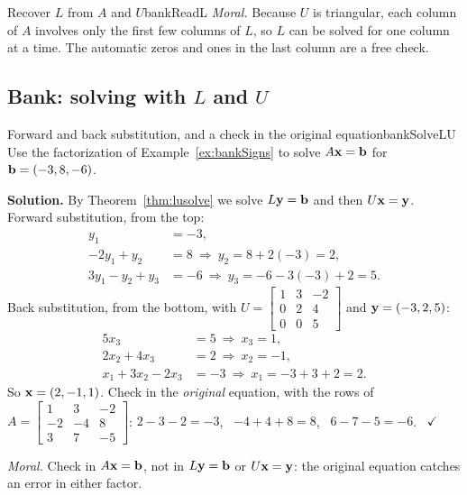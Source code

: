 \documentclass[11pt]{article}
\begin{document}
\begin{exmp}{Recover $L$ from $A$ and $U$}{bankReadL}
\emph{Moral.} Because $U$ is triangular, each column of $A$ involves only the first few columns of $L$, so $L$ can be solved for one column at a time. The automatic zeros and ones in the last column are a free check.
\end{exmp}

\subsection*{Bank: solving with $L$ and $U$}

\begin{exmp}{Forward and back substitution, and a check in the original equation}{bankSolveLU}
Use the factorization of Example~\ref{ex:bankSigns} to solve $A\mathbf{x}=\mathbf{b}$ for $\mathbf{b}=(-3,8,-6)$.

\textbf{Solution.} By Theorem~\ref{thm:lusolve} we solve $L\mathbf{y}=\mathbf{b}$ and then $U\mathbf{x}=\mathbf{y}$. Forward substitution, from the top:
\begin{align*}
y_1&=-3,\\
-2y_1+y_2&=8\ \Rightarrow\ y_2=8+2(-3)=2,\\
3y_1-y_2+y_3&=-6\ \Rightarrow\ y_3=-6-3(-3)+2=5.
\end{align*}
Back substitution, from the bottom, with $U=\begin{bmatrix}1&3&-2\\0&2&4\\0&0&5\end{bmatrix}$ and $\mathbf{y}=(-3,2,5)$:
\begin{align*}
5x_3&=5\ \Rightarrow\ x_3=1,\\
2x_2+4x_3&=2\ \Rightarrow\ x_2=-1,\\
x_1+3x_2-2x_3&=-3\ \Rightarrow\ x_1=-3+3+2=2.
\end{align*}
So $\mathbf{x}=(2,-1,1)$. Check in the \emph{original} equation, with the rows of $A=\begin{bmatrix}1&3&-2\\-2&-4&8\\3&7&-5\end{bmatrix}$: $2-3-2=-3$, \ $-4+4+8=8$, \ $6-7-5=-6$. \ $\checkmark$

\emph{Moral.} Check in $A\mathbf{x}=\mathbf{b}$, not in $L\mathbf{y}=\mathbf{b}$ or $U\mathbf{x}=\mathbf{y}$: the original equation catches an error in either factor.
\end{exmp}
\end{document}
